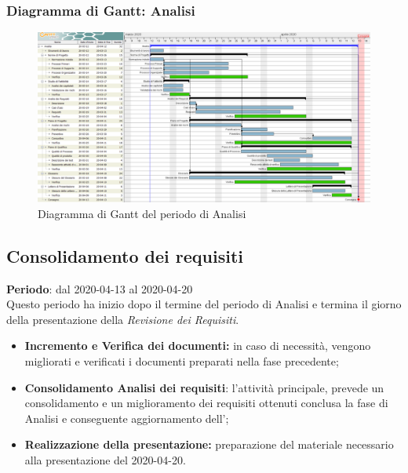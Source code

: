 	\subsubsection{Diagramma di Gantt: Analisi}
		\begin{figure}[h]
			\centering
			\includegraphics[width=1.1\textwidth]{./res/img/DiagrammiGantt/analisi_gantt.png}
			\caption{Diagramma di Gantt del periodo di Analisi}
		\end{figure}

\subsection{Consolidamento dei requisiti}
\textbf{Periodo}: dal 2020-04-13 al 2020-04-20 \\
Questo periodo ha inizio dopo il termine del periodo di Analisi e termina il giorno della presentazione della \textit{Revisione dei Requisiti}. \\
\begin{itemize}
	\item \textbf{Incremento e Verifica dei documenti:} in caso di necessità, vengono migliorati e verificati i documenti preparati nella fase precedente;
	\item \textbf{Consolidamento Analisi dei requisiti}: l'attività principale, prevede un consolidamento e un miglioramento dei requisiti ottenuti conclusa la fase di Analisi e conseguente aggiornamento dell'\textit{\AdR{}};
	\item \textbf{Realizzazione della presentazione:} preparazione del materiale necessario alla presentazione del 2020-04-20.
\end{itemize}
